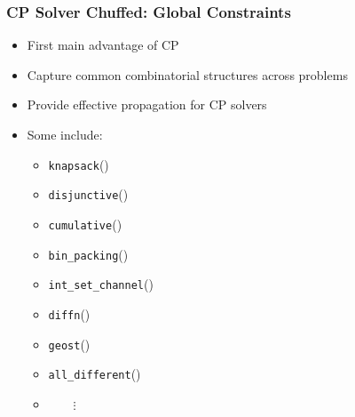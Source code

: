\documentclass{beamer}
\begin{document}
\begin{frame}
\frametitle{CP Solver Chuffed: Global Constraints}

\begin{itemize}
	\item First main advantage of CP\vspace{1mm}
	\item Capture common combinatorial structures across problems\vspace{1mm}
	\item Provide effective propagation for CP solvers\vspace{2mm}\pause
	\item Some include:\vspace{2mm}
	\begin{itemize}
		\item {\tt knapsack}()\vspace{1mm}
		\item {\tt disjunctive}()\vspace{1mm}
		\item {\tt cumulative}()\vspace{1mm}
		\item {\tt bin\_packing}()\vspace{1mm}
		\item \small{\tt int\_set\_channel}()\vspace{1.5mm}
		\item \footnotesize{\tt diffn}()\vspace{1mm}
		\item \scriptsize{\tt geost}()\vspace{2mm}
		\item \tiny{\tt all\_different}()\vspace{1mm}
		\item $\qquad\vdots$
	\end{itemize}
\end{itemize}
\end{frame}
\end{document}
